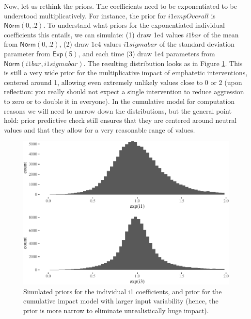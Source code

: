 \documentclass[preprint,12pt]{elsarticle}
\begin{document}
\normalsize

Now, let us rethink the priors. The coefficients need to be exponentiated to be understood multiplicatively. For instance, the prior for
\(i1empOverall\) is \(\textsf{Norm}(0,.2)\). To understand what priors
for the exponentiated individual coefficients this entails, we can
simulate: (1) draw 1e4 values \(i1bar\) of the mean from
\(\textsf{Norm}(0,.2)\), (2) draw 1e4 values \(i1sigmabar\) of the
standard deviation parameter from \(\mathsf{Exp(5)}\), and each time (3)
draw 1e4 parameters from \(\mathsf{Norm}(i1bar,i1sigmabar)\). The
resulting distribution looks as in Figure \ref{fig:priori1plot}. This is
still a very wide prior for the multiplicative impact of emphatetic
interventions, centered around 1, allowing even extremely unlikely
values close to 0 or 2 (upon reflection: you really should not expect a
single intervention to reduce aggression to zero or to double it in
everyone). In the cumulative model for computation reasons we will need
to narrow down the distributions, but the general point hold: prior
predictive check still ensures that they are centered around neutral
values and that they allow for a very reasonable range of values.


\begin{figure}

\begin{center}\includegraphics[width=1\linewidth]{ figures/priori1plot-1} \end{center}
\caption{Simulated priors for the individual i1 coefficients, and prior for the cumulative impact model with larger input variability (hence, the prior is more narrow to eliminate unrealistically huge impact).}
\label{fig:priori1plot}
\end{figure}
\end{document}
